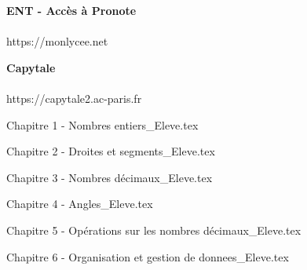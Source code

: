 \documentclass[a4paper,12pt,twoside]{article}
\numberwithin{dummy}{section}
\theoremstyle{ocrenumboxTh}
\theoremstyle{ocrenumboxExercice}
\theoremstyle{ocrenumboxExercice}
\theoremstyle{ocrenumboxEx}
\theoremstyle{ocrenumboxEx}
\theoremstyle{ocrenumboxTh}
\theoremstyle{ocrenumboxTh*}
\theoremstyle{ocrenumboxTh}
\theoremstyle{ocrenumboxTh*}
\theoremstyle{ocrenumboxCoro}
\theoremstyle{ocrenumboxCoro*}
\theoremstyle{ocrenumboxCoro}
\theoremstyle{ocrenumboxCoro*}
\theoremstyle{ocrenumboxProp}
\theoremstyle{ocrenumboxProp*}
\theoremstyle{ocrenumboxProp}
\theoremstyle{ocrenumboxProp*}
\theoremstyle{ocrenumboxMéthode}
\theoremstyle{ocrenumboxMéthode}
\theoremstyle{ocrenumboxDef}
\theoremstyle{ocrenumboxDef*}
\theoremstyle{ocrenumboxDef}
\theoremstyle{ocrenumboxDef*}
\theoremstyle{ocrenumboxReg}
\theoremstyle{ocrenumboxReg*}
\theoremstyle{ocrenumboxReg}
\theoremstyle{ocrenumboxReg*}
\theoremstyle{ocrenumboxVoc}
\theoremstyle{ocrenumboxVoc}
\theoremstyle{ocrenumboxNot}
\theoremstyle{ocrenumboxNot}
\theoremstyle{ocrenumboxNot*}
\theoremstyle{ocrenumboxNot*}
\theoremstyle{ocrenum}
\begin{document}
\begin{minipage}[c]{0.5\linewidth}
   \begin{center}
\textbf{\textcolor{Couleur8}{ENT - Accès à Pronote}}\\
\vspace{5mm}
\\
\vspace{5mm}
\textcolor{Couleur6}{https://monlycee.net}\\
\end{center}
\end{minipage}
\hfill
\begin{minipage}[c]{0.3\linewidth}
     \begin{center}
\textbf{\textcolor{Couleur8}{Capytale}}\\
\vspace{5mm}
\\
\vspace{5mm}
\textcolor{Couleur6}{https://capytale2.ac-paris.fr}\\
\end{center}  
      \end{minipage}
      
      \vfill
      
      \newpage
\tableofcontents

\newpage

{Chapitre 1 - Nombres entiers_Eleve.tex}

\newpage


{Chapitre 2 - Droites et segments_Eleve.tex}

\newpage

{Chapitre 3 - Nombres décimaux_Eleve.tex}

\newpage

{Chapitre 4 - Angles_Eleve.tex}

\newpage

{Chapitre 5 - Opérations sur les nombres décimaux_Eleve.tex}

\newpage

{Chapitre 6 - Organisation et gestion de donnees_Eleve.tex}
\end{document}
